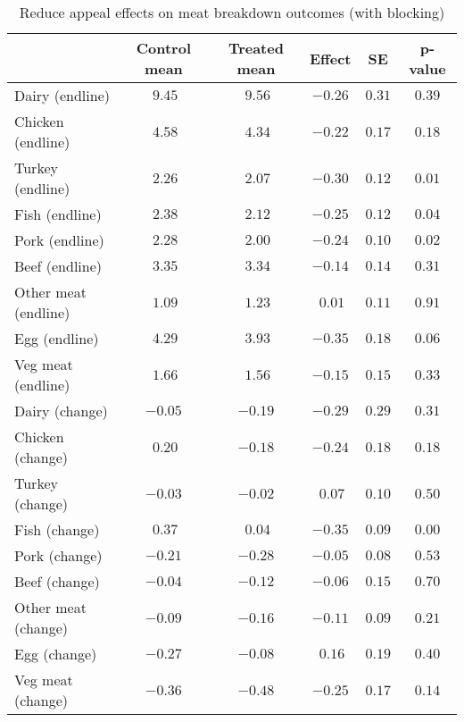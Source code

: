\begin{table*}[ht]
\caption{Reduce appeal effects on meat breakdown outcomes (with blocking)\label{round}} 
\begin{center}
\begin{tabular}{lccccc}
\hline\hline
\multicolumn{1}{l}{}&\multicolumn{1}{c}{Control mean}&\multicolumn{1}{c}{Treated mean}&\multicolumn{1}{c}{Effect}&\multicolumn{1}{c}{SE}&\multicolumn{1}{c}{p-value}\tabularnewline
\hline
Dairy (endline)&$~9.45$&$~9.56$&$-0.26$&$0.31$&$0.39$\tabularnewline
Chicken (endline)&$~4.58$&$~4.34$&$-0.22$&$0.17$&$0.18$\tabularnewline
Turkey (endline)&$~2.26$&$~2.07$&$-0.30$&$0.12$&$0.01$\tabularnewline
Fish (endline)&$~2.38$&$~2.12$&$-0.25$&$0.12$&$0.04$\tabularnewline
Pork (endline)&$~2.28$&$~2.00$&$-0.24$&$0.10$&$0.02$\tabularnewline
Beef (endline)&$~3.35$&$~3.34$&$-0.14$&$0.14$&$0.31$\tabularnewline
Other meat (endline)&$~1.09$&$~1.23$&$~0.01$&$0.11$&$0.91$\tabularnewline
Egg (endline)&$~4.29$&$~3.93$&$-0.35$&$0.18$&$0.06$\tabularnewline
Veg meat (endline)&$~1.66$&$~1.56$&$-0.15$&$0.15$&$0.33$\tabularnewline
Dairy (change)&$-0.05$&$-0.19$&$-0.29$&$0.29$&$0.31$\tabularnewline
Chicken (change)&$~0.20$&$-0.18$&$-0.24$&$0.18$&$0.18$\tabularnewline
Turkey (change)&$-0.03$&$-0.02$&$~0.07$&$0.10$&$0.50$\tabularnewline
Fish (change)&$~0.37$&$~0.04$&$-0.35$&$0.09$&$0.00$\tabularnewline
Pork (change)&$-0.21$&$-0.28$&$-0.05$&$0.08$&$0.53$\tabularnewline
Beef (change)&$-0.04$&$-0.12$&$-0.06$&$0.15$&$0.70$\tabularnewline
Other meat (change)&$-0.09$&$-0.16$&$-0.11$&$0.09$&$0.21$\tabularnewline
Egg (change)&$-0.27$&$-0.08$&$~0.16$&$0.19$&$0.40$\tabularnewline
Veg meat (change)&$-0.36$&$-0.48$&$-0.25$&$0.17$&$0.14$\tabularnewline
\hline
\end{tabular}\end{center}

\end{table*}
